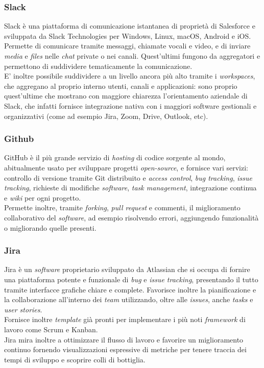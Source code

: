 \subsubsection{Slack}
Slack è una piattaforma di comunicazione istantanea di proprietà di Salesforce e sviluppata da Slack Technologies per Windows, Linux, macOS, Android e iOS.\\
Permette di comunicare tramite messaggi, chiamate vocali e video, e di inviare \textit{media} e \textit{files} nelle \textit{chat} private o nei canali. Quest'ultimi fungono da aggregatori e permettono di suddividere tematicamente la comunicazione.\\
E' inoltre possibile suddividere a un livello ancora più alto tramite i \textit{workspaces}, che aggregano al proprio interno utenti, canali e applicazioni: sono proprio quest'ultime che mostrano con maggiore chiarezza l'orientamento aziendale di Slack, che infatti fornisce integrazione nativa con i maggiori software gestionali e organizzativi (come ad esempio Jira, Zoom, Drive, Outlook, etc).

\subsubsection{Github}
GitHub è il più grande servizio di \textit{hosting} di codice sorgente al mondo, abitualmente usato per sviluppare progetti \textit{open-source}, e fornisce vari servizi: controllo di versione tramite Git distribuito e \textit{access control}, \textit{bug tracking}, \textit{issue tracking}, richieste di modifiche \textit{software}, \textit{task management}, integrazione continua e \textit{wiki} per ogni progetto.\\ 
Permette inoltre, tramite \textit{forking}, \textit{pull request} e commenti, il miglioramento collaborativo del \textit{software}, ad esempio risolvendo errori, aggiungendo funzionalità o migliorando quelle presenti.

\subsubsection{Jira}
Jira è un \textit{software} proprietario sviluppato da Atlassian che si occupa di fornire una piattaforma potente e funzionale di \textit{bug} e \textit{issue tracking}, presentando il tutto tramite interfacce grafiche chiare e complete. Favorisce inoltre la pianificazione e la collaborazione all'interno dei \textit{team} utilizzando, oltre alle \textit{issues}, anche \textit{tasks} e \textit{user stories}.\\
Fornisce inoltre \textit{template} già pronti per implementare i più noti \textit{framework} di lavoro come Scrum e Kanban.\\
Jira mira inoltre a ottimizzare il flusso di lavoro e favorire un miglioramento continuo fornendo visualizzazioni espressive di metriche per tenere traccia dei tempi di sviluppo e scoprire colli di bottiglia.

